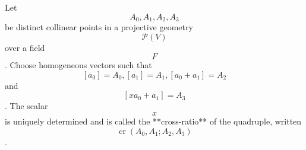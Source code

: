 Let $$A_0, A_1, A_2, A_3$$ be distinct collinear points in a projective geometry $$\mathcal{P}(V)$$ over a field $$F$$. Choose homogeneous vectors such that $$[a_0] = A_0, [a_1] = A_1, [a_0 + a_1] = A_2$$ and $$[x a_0 + a_1] = A_3$$. The scalar $$x$$ is uniquely determined and is called the **cross-ratio** of the quadruple, written $$\operatorname{cr}(A_0, A_1; A_2, A_3)$$.
